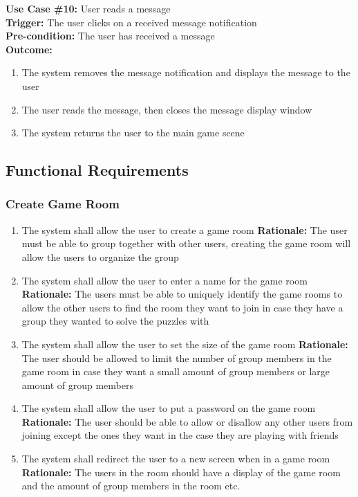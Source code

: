 \documentclass[12pt]{article}
\begin{document}
\textbf{Use Case \#10:} User reads a message\\
\textbf{Trigger:} The user clicks on a received message notification\\
\textbf{Pre-condition:} The user has received a message\\
\textbf{Outcome:}
\begin{enumerate}
        \item The system removes the message notification and displays the message to the user
	\item The user reads the message, then closes the message display window
	\item The system returns the user to the main game scene
\end{enumerate}

\subsection{Functional Requirements}
\subsubsection{Create Game Room}
\begin{enumerate}[label=CG\arabic*., series=CreateGame]
    \item The system shall allow the user to create a game room \newline 
    \textbf{Rationale:} The user must be able to group together with other users, creating the game room will allow the users to organize the group
    \item The system shall allow the user to enter a name for the game room \newline
    \textbf{Rationale:} The users must be able to uniquely identify the game rooms to allow the other users to find the room they want to join in case they have a group they wanted to solve the puzzles with
    \item The system shall allow the user to set the size of the game room \newline
    \textbf{Rationale:} The user should be allowed to limit the number of group members in the game room in case they want a small amount of group members or large amount of group members
    \item The system shall allow the user to put a password on the game room \newline
    \textbf{Rationale:} The user should be able to allow or disallow any other users from joining except the ones they want in the case they are playing with friends
    \item The system shall redirect the user to a new screen when in a game room \newline
    \textbf{Rationale: } The users in the room should have a display of the game room and the amount of group members in the room etc. 
\end{enumerate}
\end{document}
